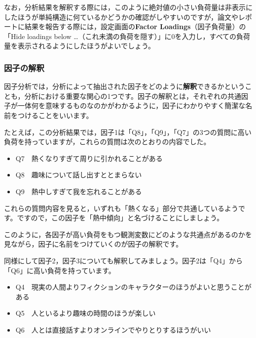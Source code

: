 \documentclass[
  12pt,
  a5jpaper,
  lualatex, ja=standard]{bxjsbook}
\providecommand{\tightlist}{%
  \setlength{\itemsep}{0pt}\setlength{\parskip}{0pt}}
\newenvironment{jmvorange}{%
	\begin{center}%
	\begin{tcolorbox}[%
		colframe=daidai,
		colbacktitle=daidai!30!white,
		coltitle=daidai!10!black,
		colback=daidai!2!white,
		breakable,
		width=.9\textwidth
		]\small\addtolength{\leftmargini}{-3\labelsep}%
	}%
	{\end{tcolorbox}\end{center}}
\begin{document}
なお，分析結果を解釈する際には，このように絶対値の小さい負荷量は非表示にしたほうが単純構造に何ているかどうかの確認がしやすいのですが，論文やレポートに結果を報告する際には，設定画面の\textbf{Factor Loadings}（因子負荷量）の「Hide loadings below \ldots（これ未満の負荷を隠す）」に0を入力し，すべての負荷量を表示されるようにしたほうがよいでしょう。

\hypertarget{subsub:factor-efa-factor-interpretation}{%
\subsubsection*{因子の解釈}\label{subsub:factor-efa-factor-interpretation}}

因子分析では，分析によって抽出された因子をどのように\textbf{解釈}できるかということも，分析における重要な関心の1つです。因子の解釈とは，それぞれの共通因子が一体何を意味するものなのかがわかるように，因子にわかりやすく簡潔な名前をつけることをいいます。

たとえば，この分析結果では，因子1は「Q8」，「Q9」，「Q7」の3つの質問に高い負荷を持っていますが，これらの質問は次のとおりの内容でした。

\begin{jmvorange}

\begin{itemize}
\tightlist
\item
  Q7　熱くなりすぎて周りに引かれることがある
\item
  Q8　趣味について話し出すととまらない
\item
  Q9　熱中しすぎて我を忘れることがある
\end{itemize}

\end{jmvorange}

これらの質問内容を見ると，いずれも「熱くなる」部分で共通しているようです。ですので，この因子を「熱中傾向」と名づけることにしましょう。

このように，各因子が高い負荷をもつ観測変数にどのような共通点があるのかを見ながら，因子に名前をつけていくのが因子の解釈です。

同様にして因子2，因子3についても解釈してみましょう。因子2は「Q4」から「Q6」に高い負荷を持っています。

\begin{jmvorange}

\begin{itemize}
\tightlist
\item
  Q4　現実の人間よりフィクションのキャラクターのほうがよいと思うことがある
\item
  Q5　人といるより趣味の時間のほうが楽しい
\item
  Q6　人とは直接話すよりオンラインでやりとりするほうがいい
\end{itemize}

\end{jmvorange}
\end{document}
